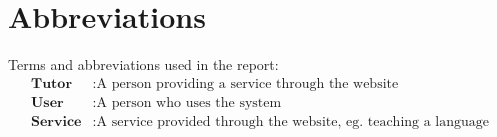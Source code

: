 \chapter*{Abbreviations}
Terms and abbreviations used in the report:
\begin{align*}
    \textbf{Tutor} &: \text{A person providing a service through the website} \\
    \textbf{User} &: \text{A person who uses the system} \\
    \textbf{Service} &: \text{A service provided through the website, eg. teaching a language} \\
\end{align*}

